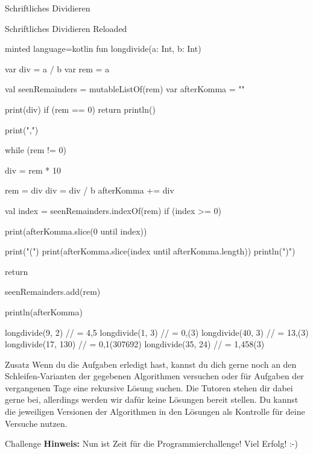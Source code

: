 \begin{task}[points=auto]{Schriftliches Dividieren}
\begin{subtask*}[points=0]{Schriftliches Dividieren Reloaded }
        \begin{solution}
            \begin{codeBlock}[]{minted language=kotlin}
                fun longdivide(a: Int, b: Int) {
                    var div = a / b
                    var rem = a %

                    val seenRemainders = mutableListOf(rem)
                    var afterKomma = ""

                    print(div)
                    if (rem == 0) {
                        return
                        println()
                    }

                    print(",")

                    while (rem != 0) {
                        div = rem * 10

                        rem = div %
                        div = div / b
                        afterKomma += div

                        val index = seenRemainders.indexOf(rem)
                        if (index >= 0) {
                            print(afterKomma.slice(0 until index))

                            print("(")
                            print(afterKomma.slice(index until afterKomma.length))
                            println(")")

                            return
                        }

                        seenRemainders.add(rem)
                    }

                    println(afterKomma)
                }

                longdivide(9, 2) // = 4,5
                longdivide(1, 3) // = 0,(3)
                longdivide(40, 3) // = 13,(3)
                longdivide(17, 130) // = 0,1(307692)
                longdivide(35, 24) // = 1,458(3)
            \end{codeBlock}
        \end{solution}
    \end{subtask*}
\end{task}
\begin{task}[points=auto]{Zusatz}
    Wenn du die Aufgaben erledigt hast, kannst du dich gerne noch an den Schleifen-Varianten der gegebenen Algorithmen versuchen oder für Aufgaben der vergangenen Tage eine rekursive Lösung suchen. Die Tutoren stehen dir dabei gerne bei, allerdings werden wir dafür keine Lösungen bereit stellen. Du kannst die jeweiligen Versionen der Algorithmen in den Lösungen als Kontrolle für deine Versuche nutzen.
\end{task}
\begin{task}[points=auto]{Challenge}
    \large \textbf{Hinweis:} Nun ist Zeit für die Programmierchallenge! Viel Erfolg! :-)
\end{task}

